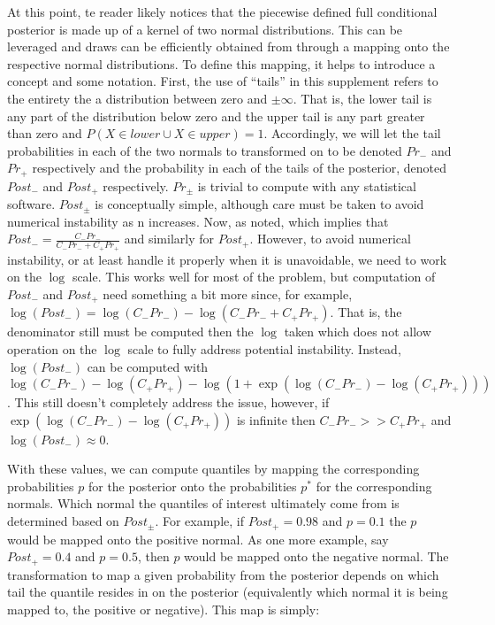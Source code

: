 \begin{appendices}
At this point, te reader likely notices that the piecewise defined full conditional posterior is made up of a kernel of two normal distributions. This can be leveraged and draws can be efficiently obtained from through a mapping onto the respective normal distributions. To define this mapping, it helps to introduce a concept and some notation. First, the use of ``tails'' in this supplement refers to the entirety the a distribution between zero and $\pm \infty$. That is, the lower tail is any part of the distribution below zero and the upper tail is any part greater than zero and $P(X \in lower \cup X \in upper) = 1$. Accordingly, we will let the tail probabilities in each of the two normals to transformed on to be denoted $Pr_{-}$ and $Pr_{+}$ respectively and the probability in each of the tails of the posterior, denoted $Post_{-}$ and $Post_{+}$ respectively. $Pr_{\pm}$ is trivial to compute with any statistical software. $Post_{\pm}$ is conceptually simple, although care must be taken to avoid numerical instability as n increases. Now, as noted,
 which implies that $Post_- = \frac{C_{-} Pr_{-}}{C_{-} Pr_{-} + C_{+} Pr_{+}}$ and similarly for $Post_+$. However, to avoid numerical instability, or at least handle it properly when it is unavoidable, we need to work on the $\log$ scale. This works well for most of the problem, but computation of $Post_-$ and $Post_+$ need something a bit more since, for example, $\log(Post_-) = \log(C_{-}Pr_{-}) - \log(C_{-} Pr_{-} + C_{+} Pr_{+})$. That is, the denominator still must be computed then the $\log$ taken which does not allow operation on the $\log$ scale to fully address potential instability. Instead, $\log(Post_-)$ can be computed with $\log(C_-Pr_-) -  \log(C_+Pr_+) - \log(1 + \exp(\log(C_-Pr_-) -  \log(C_+Pr_+)))$. This still doesn't completely address the issue, however, if $\exp(\log(C_-Pr_-) -  \log(C_+Pr_+))$ is infinite then $C_-Pr_- >> C_+Pr_+$ and $\log(Post_-) \approx 0$.

With these values, we can compute quantiles by mapping the corresponding probabilities $p$ for the posterior onto the probabilities $p^*$ for the corresponding normals. Which normal the quantiles of interest ultimately come from is determined based on $Post_{\pm}$. For example, if $Post_{+} = 0.98$ and $p = 0.1$ the $p$ would be mapped onto the positive normal. As one more example, say $Post_{+} = 0.4$ and $p = 0.5$, then $p$ would be mapped onto the negative normal. The transformation to map a given probability from the posterior depends on which tail the quantile resides in on the posterior (equivalently which normal it is being mapped to, the positive or negative). This map is simply:


\end{appendices}

